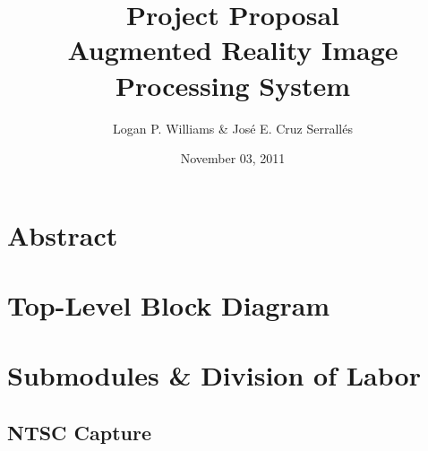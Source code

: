 \documentclass{article}
\begin{document}
\title{Project Proposal\\Augmented Reality Image Processing System}
\author{Logan P. Williams \& Jos\'{e} E. Cruz Serrall\'{e}s}
\date{November 03, 2011}
\maketitle

\section{Abstract}

\section{Top-Level Block Diagram}

\section{Submodules \& Division of Labor}
\subsection{NTSC Capture}
\end{document}
